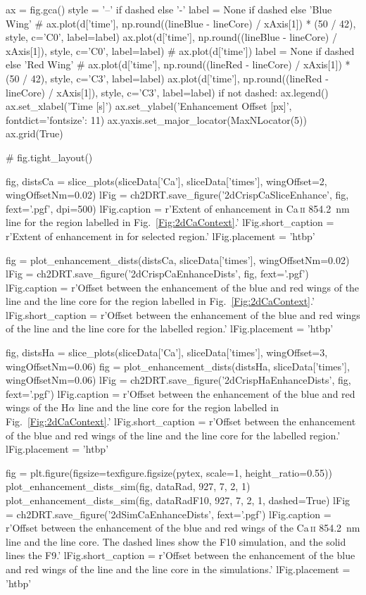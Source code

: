 \begin{pycode}[2DRT]
    ax = fig.gca()
    style = '--' if dashed else '-'
    label = None if dashed else 'Blue Wing'
    # ax.plot(d['time'], np.round((lineBlue - lineCore) / xAxis[1]) * (50 / 42), style, c='C0', label=label)
    ax.plot(d['time'], np.round((lineBlue - lineCore) / xAxis[1]), style, c='C0', label=label)
#     ax.plot(d['time'])
    label = None if dashed else 'Red Wing'
    # ax.plot(d['time'], np.round((lineRed - lineCore) / xAxis[1]) * (50 / 42), style, c='C3', label=label)
    ax.plot(d['time'], np.round((lineRed - lineCore) / xAxis[1]), style, c='C3', label=label)
    if not dashed:
        ax.legend()
    ax.set_xlabel('Time [s]')
    ax.set_ylabel('Enhancement Offset [px]', fontdict={'fontsize': 11})
    ax.yaxis.set_major_locator(MaxNLocator(5))
    ax.grid(True)

    # fig.tight_layout()

fig, distsCa = slice_plots(sliceData['Ca'], sliceData['times'], wingOffset=2, wingOffsetNm=0.02)
lFig = ch2DRT.save_figure('2dCrispCaSliceEnhance', fig, fext='.pgf', dpi=500)
lFig.caption = r'Extent of enhancement in Ca\,\textsc{ii} \SI{854.2}{\nano\metre} line for the region labelled in Fig.~\ref{Fig:2dCaContext}.'
lFig.short_caption = r'Extent of enhancement in \CaLine{} for selected region.'
lFig.placement = 'htbp'

fig = plot_enhancement_dists(distsCa, sliceData['times'], wingOffsetNm=0.02)
lFig = ch2DRT.save_figure('2dCrispCaEnhanceDists', fig, fext='.pgf')
lFig.caption = r'Offset between the enhancement of the blue and red wings of the \CaLine{} line and the line core for the region labelled in Fig.~\ref{Fig:2dCaContext}.'
lFig.short_caption = r'Offset between the enhancement of the blue and red wings of the \CaLine{} line and the line core for the labelled region.'
lFig.placement = 'htbp'

fig, distsHa = slice_plots(sliceData['Ca'], sliceData['times'], wingOffset=3, wingOffsetNm=0.06)
fig = plot_enhancement_dists(distsHa, sliceData['times'], wingOffsetNm=0.06)
lFig = ch2DRT.save_figure('2dCrispHaEnhanceDists', fig, fext='.pgf')
lFig.caption = r'Offset between the enhancement of the blue and red wings of the H$\alpha$ line and the line core for the region labelled in Fig.~\ref{Fig:2dCaContext}.'
lFig.short_caption = r'Offset between the enhancement of the blue and red wings of the \Ha{} line and the line core for the labelled region.'
lFig.placement = 'htbp'

fig = plt.figure(figsize=texfigure.figsize(pytex, scale=1, height_ratio=0.55))
plot_enhancement_dists_sim(fig, dataRad, 927, 7, 2, 1)
plot_enhancement_dists_sim(fig, dataRadF10, 927, 7, 2, 1, dashed=True)
lFig = ch2DRT.save_figure('2dSimCaEnhanceDists', fext='.pgf')
lFig.caption = r'Offset between the enhancement of the blue and red wings of the Ca\,\textsc{ii} \SI{854.2}{\nano\metre} line and the line core. The dashed lines show the F10 simulation, and the solid lines the F9.'
lFig.short_caption = r'Offset between the enhancement of the blue and red wings of the \CaLine{} line and the line core in the simulations.'
lFig.placement = 'htbp'


\end{pycode}
